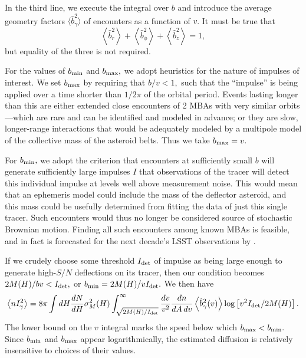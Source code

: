 \documentclass[linenumbers, onecolumn]{aastex631}
\begin{document}
In the third line, we execute the integral over $b$ and introduce the
average geometry factors $\langle \hat b^2_\gamma\rangle$ of encounters as
a function of $v$.  It must be true that
\begin{equation}
  \left\langle \hat b_r^2 \right\rangle
  + \left\langle \hat b_\phi^2 \right\rangle
  + \left\langle \hat b_z^2 \right\rangle = 1,
\end{equation}
but equality of the three is not required.

For the values of $b_{\rm min}$ and $b_{\rm max},$ we adopt heuristics
for the nature of impulses of interest.  We set $b_{\rm max}$ by 
requiring that $b/v<1,$ such that the ``impulse'' is being applied
over a time shorter than $1/2\pi$ of the orbital period.  Events
lasting longer than this are either extended close encounters of 2
MBAs with very similar orbits---which are rare and can be identified
and modeled in advance; or they are slow, longer-range interactions
that would be adequately modeled by a multipole model of the
collective mass of the asteroid belts.  Thus we take $b_{\rm max}=v.$

For $b_{\rm min},$ we adopt the criterion that encounters at
sufficiently small $b$ will generate sufficiently large impulses $I$
that observations of the tracer will detect this individual impulse at
levels well above measurement noise.  This would mean that an
ephemeris model could include the mass of the deflector asteroid, and
this mass could be usefully determined from fitting the data of just this
single tracer.
Such encounters would thus no longer be considered source of
stochastic Brownian motion.  Finding all such encounters among known
MBAs is feasible, and in fact is forecasted for the next decade's LSST
observations by
\citet{negin}. 

If we crudely choose some threshold
$I_{\rm det}$ of impulse as being large enough to generate high-$S/N$
deflections on its tracer, then our condition becomes $2M(H)/bv <
I_{\rm det},$ or $b_{\rm min}=2M(H)/vI_{\rm det}.$  We then have
\begin{equation}
   \left\langle n I_\gamma^2 \right\rangle = 
8\pi \int dH \frac{dN}{dH} \sigma^2_M(H)  \int_{\sqrt{2M(H)/I_{\rm
      det}}}^\infty \frac{dv}{v^2} 
        \frac{dn}{dA\,dv}  \left\langle\hat b_\gamma^2(v)\right\rangle
        \log \left[v^2 I_{\rm det}/2M(H)\right].
        \label{eq:nI2}
      \end{equation}
The lower bound on the $v$ integral marks the speed below which
$b_{\rm max}<b_{\rm min}.$  Since $b_{\rm min}$ and $b_{\rm max}$
appear logarithmically, the estimated diffusion is relatively insensitive to choices of
their values.
\end{document}
